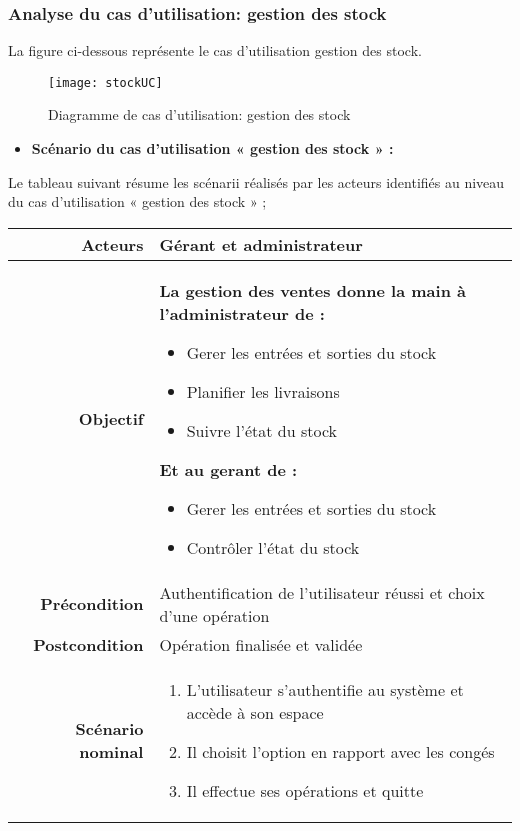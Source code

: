 \documentclass[a4paper,11pt]{article}
\begin{document}
\subsubsection{Analyse du cas d'utilisation: gestion des stock}
La figure ci-dessous représente le cas d'utilisation gestion des stock.
\newpage
\begin{figure}[ht]
\texttt{[image: stockUC]}
\caption{Diagramme de cas d'utilisation: gestion des stock} 
\end{figure}
\begin{itemize}
  \item \textbf{Scénario du cas d’utilisation « gestion des stock » :} 
\end{itemize}
Le tableau suivant résume les scénarii réalisés par les acteurs identifiés au niveau du cas
d’utilisation « gestion des stock » ;
\newline
\newline
\begin{tabular}{|r|l|} \hline
\textbf{Acteurs} & Gérant et administrateur\\ \hline
\textbf{Objectif} & \begin{minipage}{0.95\textwidth}
  \textbf{La gestion des ventes donne la main à l'administrateur de :}
  \begin{itemize}
    \item Gerer les entrées et sorties du stock
    \item Planifier les livraisons
    \item Suivre l'état du stock
  \end{itemize}
  \textbf{Et au gerant de :}
  \begin{itemize}
    \item Gerer les entrées et sorties du stock
    \item Contrôler l'état du stock 
  \end{itemize}
\end{minipage} \\ \hline
\textbf{Précondition} & Authentification de l'utilisateur réussi et choix d'une opération \\ \hline
\textbf{Postcondition} & Opération finalisée et validée \\ \hline
\textbf{Scénario nominal} & \begin{minipage}{0.95\textwidth}
  \begin{enumerate}
    \item L'utilisateur s'authentifie au système et accède à son espace
    \item Il choisit l'option en rapport avec les congés
    \item Il effectue ses opérations et quitte
\end{enumerate}
\end{minipage} \\ \hline
\end{tabular}
\end{document}
